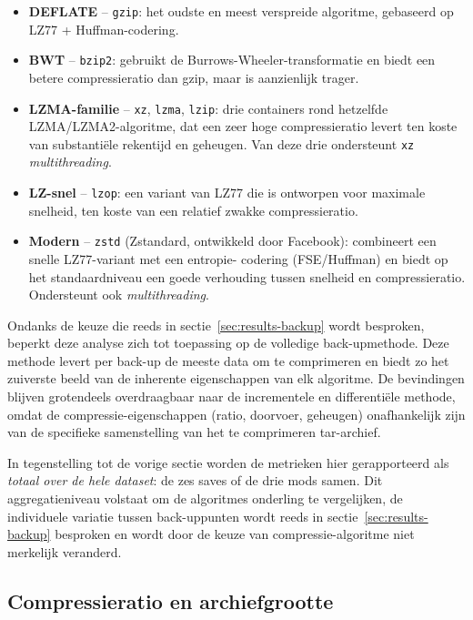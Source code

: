 \begin{itemize}
    \item \textbf{DEFLATE} -- \texttt{gzip}: het oudste en meest verspreide algoritme, gebaseerd op LZ77 + Huffman-codering.
    \item \textbf{BWT} -- \texttt{bzip2}: gebruikt de Burrows-Wheeler-transformatie en biedt een betere compressieratio dan gzip, maar is aanzienlijk trager.
    \item \textbf{LZMA-familie} -- \texttt{xz}, \texttt{lzma}, \texttt{lzip}: drie containers rond hetzelfde LZMA/LZMA2-algoritme, dat een zeer hoge compressieratio levert ten koste van substantiële rekentijd en geheugen. Van deze drie ondersteunt \texttt{xz} \textit{multithreading}.
    \item \textbf{LZ-snel} -- \texttt{lzop}: een variant van LZ77 die is ontworpen voor maximale snelheid, ten koste van een relatief zwakke compressieratio.
    \item \textbf{Modern} -- \texttt{zstd} (Zstandard, ontwikkeld door Facebook): combineert een snelle LZ77-variant met een entropie- codering (FSE/Huffman) en biedt op het standaardniveau een goede verhouding tussen snelheid en compressieratio. Ondersteunt ook \textit{multithreading}.
\end{itemize}

Ondanks de keuze die reeds in sectie~\ref{sec:results-backup} wordt besproken, beperkt deze analyse zich tot toepassing op de volledige back-upmethode. Deze methode levert per back-up de meeste data om te comprimeren en biedt zo het zuiverste beeld van de inherente eigenschappen van elk algoritme. De bevindingen blijven grotendeels overdraagbaar naar de incrementele en differentiële methode, omdat de compressie-eigenschappen (ratio, doorvoer, geheugen) onafhankelijk zijn van de specifieke samenstelling van het te comprimeren tar-archief.

In tegenstelling tot de vorige sectie worden de metrieken hier gerapporteerd als \emph{totaal over de hele dataset}: de zes saves of de drie mods samen. Dit aggregatieniveau volstaat om de algoritmes onderling te vergelijken, de individuele variatie tussen back-uppunten wordt reeds in sectie~\ref{sec:results-backup} besproken en wordt door de keuze van compressie-algoritme niet merkelijk veranderd.

\subsection{Compressieratio en archiefgrootte}
\label{subsec:compressie-ratio}

